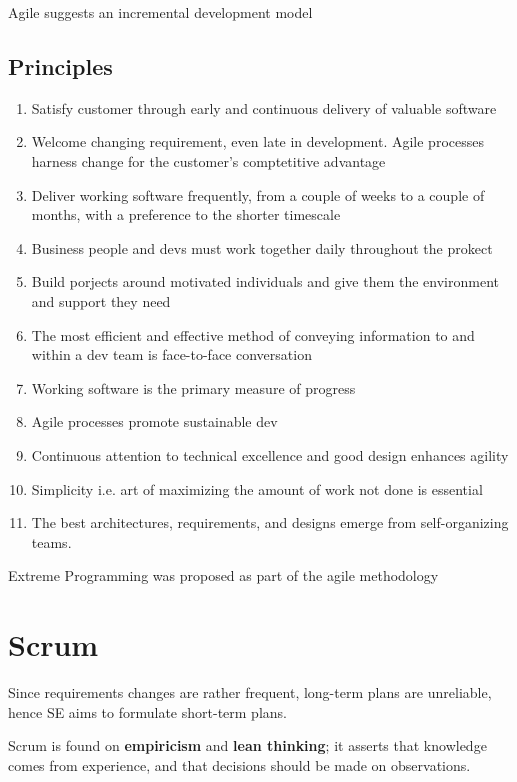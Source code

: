 Agile suggests an incremental development model

\subsection*{Principles}
\begin{enumerate}
    \label{subsec:agile_principles}
    \item Satisfy customer through early and continuous delivery of valuable software
    \item Welcome changing requirement, even late in development.
    Agile processes harness change for the customer's comptetitive advantage
    \item Deliver working software frequently, from a couple of weeks to a couple of months, with a preference to the shorter timescale
    \item Business people and devs must work together daily throughout the prokect
    \item Build porjects around motivated individuals and give them the environment and support they need
    \item The most efficient and effective method of conveying information to and within a dev team is face-to-face conversation
    \item Working software is the primary measure of progress
    \item Agile processes promote sustainable dev 
    \item Continuous attention to technical excellence and good design enhances agility
    \item Simplicity i.e. art of maximizing the amount of work not done is essential
    \item The best architectures, requirements, and designs emerge from self-organizing teams.
\end{enumerate}

Extreme Programming was proposed as part of the agile methodology

\section{Scrum}
Since requirements changes are rather frequent, long-term plans are unreliable,
hence SE aims to formulate short-term plans.

Scrum is found on \textbf{empiricism} and \textbf{lean thinking}; it asserts that knowledge comes from experience, and that decisions should be made on observations.

